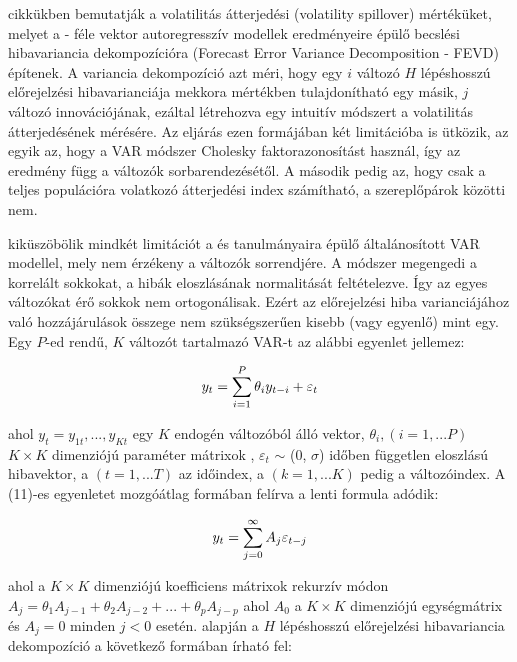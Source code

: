 \documentclass[12pt,bibliography=totoc]{article}
\begin{document}
\cite{diebold2009measuring} cikkükben bemutatják a volatilitás átterjedési (volatility spillover) mértéküket, melyet a \cite{sims1980macroeconomics} - féle vektor autoregresszív modellek eredményeire épülő becslési hibavariancia dekompozícióra (Forecast Error Variance Decomposition - FEVD) építenek. A variancia dekompozíció azt méri, hogy egy $i$ változó $H$ lépéshosszú előrejelzési hibavarianciája mekkora mértékben tulajdonítható egy másik, $j$ változó innovációjának, ezáltal létrehozva egy intuitív módszert a volatilitás átterjedésének mérésére. Az eljárás ezen formájában két limitációba is ütközik, az egyik az, hogy a VAR módszer Cholesky faktorazonosítást használ, így az eredmény függ a változók sorbarendezésétől. A második pedig az, hogy csak a teljes populációra volatkozó átterjedési index számítható, a szereplőpárok közötti nem. 

\cite{diebold2012better} kiküszöbölik mindkét limitációt a \cite{koop1996impulse} és \cite{pesaran1998generalized} tanulmányaira épülő általánosított VAR modellel, mely nem érzékeny a változók sorrendjére. A módszer megengedi  a korrelált sokkokat, a hibák eloszlásának normalitását feltételezve. Így az egyes változókat érő sokkok nem ortogonálisak.  Ezért az előrejelzési hiba varianciájához való hozzájárulások összege nem szükségszerűen kisebb (vagy egyenlő) mint egy. Egy $P$-ed rendű, $K$ változót tartalmazó VAR-t az alábbi egyenlet jellemez:

\begin{equation}
y_{t}=\sum_{i=1}^{P} \theta_{i} y_{t-i}+\varepsilon_{t} \\
\end{equation}

ahol $y_{t} = y_{1t},...,y_{Kt}$ egy $K$ endogén változóból álló vektor, $\theta_{i}, (i = 1,...P)$  $K\times K$ dimenziójú paraméter mátrixok , $\varepsilon_{t}$ $\sim$ (0, $\sigma$) időben független eloszlású hibavektor, a $(t = 1,...T)$ az időindex, a $(k = 1,...K)$ pedig a változóindex. A (11)-es egyenletet mozgóátlag formában felírva a lenti formula adódik:

\begin{equation}
y_{t}=\sum_{j=0}^{\infty} A_{j} \varepsilon_{t-j} \\
\end{equation}

ahol a $K\times K$ dimenziójú koefficiens mátrixok rekurzív módon $A_{j} = \theta_{1}A_{j-1}+ \theta_{2}A_{j-2}+...+\theta_{p}A_{j-p}$ ahol $A_{0}$ a  $K\times K$ dimenziójú egységmátrix és $A_{j} = 0$ minden $j < 0$ esetén. \cite{diebold2012better} alapján a $H$ lépéshosszú előrejelzési hibavariancia dekompozíció a következő formában írható fel:
\end{document}
